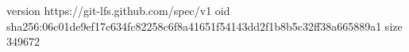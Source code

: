 version https://git-lfs.github.com/spec/v1
oid sha256:06c01de9ef17c634fc82258c6f8a41651f54143dd2f1b8b5c32ff38a665889a1
size 349672
